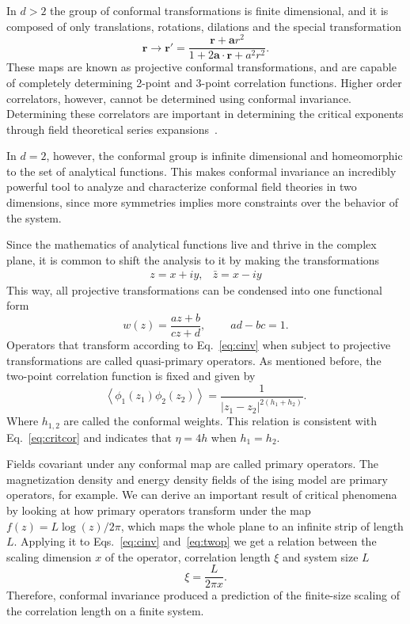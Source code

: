 In $d>2$ the group of conformal transformations is finite dimensional, and
it is composed of only translations, rotations, dilations and the special
transformation
\begin{equation}
    \mathbf{r}\rightarrow\mathbf{r}'=
    \frac{\mathbf{r}+\mathbf{a}r^{2}}{1+2\mathbf{a}\cdot\mathbf{r}+a^{2}r^{2}}.
\end{equation}
These maps are known as projective conformal transformations, and are capable
of completely determining 2-point and 3-point correlation functions. Higher
order correlators, however, cannot be determined using conformal invariance.
Determining these correlators are important in determining the critical
exponents through field theoretical series expansions~\cite{Henkel2013}.

In $d=2$, however, the conformal group is infinite dimensional and homeomorphic
to the set of analytical functions. This makes conformal invariance an
incredibly powerful tool to analyze and characterize conformal field theories
in two dimensions, since more symmetries implies more constraints over the
behavior of the system.

Since the mathematics of analytical functions live and thrive in the complex
plane, it is common to shift the analysis to it by making the transformations
\begin{equation}
    \begin{array}{cc}
        z=x+iy, & \bar{z}=x-iy
    \end{array}
\end{equation}
This way, all projective transformations can be condensed into one functional
form
\begin{equation}
    w\left(z\right)=\frac{az+b}{cz+d},\;\;\;\;\;\;\;\; ad-bc=1.
\end{equation}
Operators that transform according to Eq.~\ref{eq:cinv} when subject to
projective transformations are called quasi-primary operators.
As mentioned before, the two-point correlation function is fixed and given by
\begin{equation}
    \label{eq:twop}
    \left\langle
        \phi_{1}\left(z_{1}\right)\phi_{2}\left(z_{2}\right)
    \right\rangle =
    \frac{1}{\left|z_{1}-z_{2}\right|^{2(h_{1}+h_{2})}}.
\end{equation}
Where $h_{1,2}$ are called the conformal weights. This relation is consistent
with Eq.~\ref{eq:critcor} and indicates that $\eta=4h$ when $h_1=h_2$.

Fields covariant under any conformal map are called primary operators. The
magnetization density and energy density fields of the ising model are primary
operators, for example. We can derive an important result of critical phenomena
by looking at how primary operators transform under the map
$f(z)=L\log(z)/2\pi$, which maps the whole plane to an infinite strip of length
$L$. Applying it to Eqs.~\ref{eq:cinv} and~\ref{eq:twop} we get a relation
between the scaling dimension $x$ of the operator, correlation length $\xi$ and
system size $L$
\begin{equation}
    \xi=\frac{L}{2\pi x}.
\end{equation}
Therefore, conformal invariance produced a prediction of the finite-size
scaling of the correlation length on a finite system.

